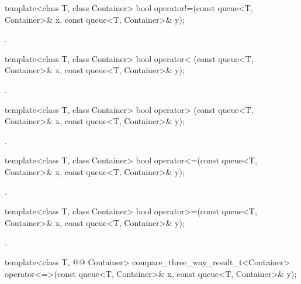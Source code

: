 %
\begin{itemdecl}
template<class T, class Container>
  bool operator!=(const queue<T, Container>& x,  const queue<T, Container>& y);
\end{itemdecl}

\begin{itemdescr}
\pnum
\returns
{}.
\end{itemdescr}

%
\begin{itemdecl}
template<class T, class Container>
  bool operator< (const queue<T, Container>& x, const queue<T, Container>& y);
\end{itemdecl}

\begin{itemdescr}
\pnum
\returns
{}.
\end{itemdescr}

%
\begin{itemdecl}
template<class T, class Container>
  bool operator> (const queue<T, Container>& x, const queue<T, Container>& y);
\end{itemdecl}

\begin{itemdescr}
\pnum
\returns
{}.
\end{itemdescr}

%
\begin{itemdecl}
template<class T, class Container>
  bool operator<=(const queue<T, Container>& x, const queue<T, Container>& y);
\end{itemdecl}

\begin{itemdescr}
\pnum
\returns
{}.
\end{itemdescr}

%
\begin{itemdecl}
template<class T, class Container>
    bool operator>=(const queue<T, Container>& x,
                    const queue<T, Container>& y);
\end{itemdecl}

\begin{itemdescr}
\pnum
\returns
{}.
\end{itemdescr}

%
\begin{itemdecl}
template<class T, @@ Container>
  compare_three_way_result_t<Container>
    operator<=>(const queue<T, Container>& x, const queue<T, Container>& y);
\end{itemdecl}

